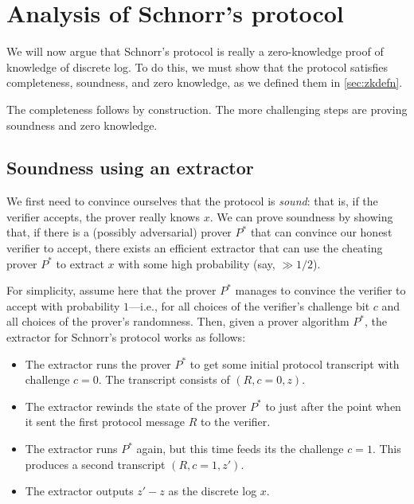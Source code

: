 \section{Analysis of Schnorr's protocol}

We will now argue that Schnorr's protocol is really
a zero-knowledge proof of knowledge of discrete log.
To do this, we must show that the protocol satisfies
completeness, soundness, and zero knowledge, as
we defined them in \cref{sec:zkdefn}.

The completeness follows by construction.
The more challenging steps are proving soundness and zero knowledge.

\subsection{Soundness using an extractor}

We first need to convince ourselves that the protocol is \emph{sound}: that is,
if the verifier accepts, the prover really knows $x$.  We can prove
soundness by showing that, if there is a (possibly adversarial) prover
$P^*$ that can convince our honest verifier to accept, there
exists an efficient extractor that can use the cheating prover $P^*$
to extract $x$ with some high probability (say, $\gg 1/2$).

For simplicity, assume here that the prover $P^*$ manages to convince
the verifier to accept with probability $1$---i.e., for all choices of
the verifier's challenge bit $c$ and all choices of the prover's randomness.
Then, given a prover algorithm $P^*$,
the extractor for Schnorr's protocol works as follows:

\begin{itemize}

\item The extractor runs the prover $P^*$ to get some initial protocol transcript with challenge $c=0$.
The transcript consists of $(R, c=0, z)$.

\item The extractor rewinds the state of the prover $P^*$ to just after the point when it
      sent the first protocol message $R$ to the verifier.

\item The extractor runs $P^*$ again, but this time feeds its the challenge $c=1$.
This produces a second transcript $(R, c=1, z')$.

\item The extractor outputs $z'-z$ as the discrete log $x$.

\end{itemize}

